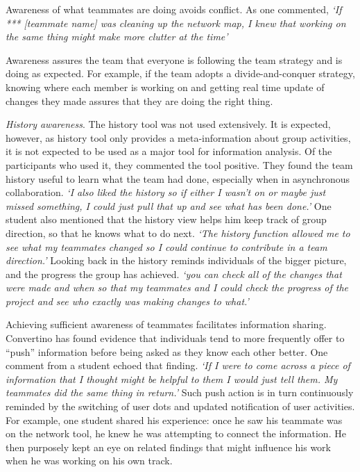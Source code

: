Awareness of what teammates are doing avoids conflict. As one commented, 
\textit{`If *** [teammate name] was cleaning up the network map, I knew that working on the same thing might make more clutter at the time'}

Awareness assures the team that everyone is following the team strategy and is doing as expected. For example, if the team adopts a divide-and-conquer strategy, knowing where each member is working on and getting real time update of changes they made assures that they are doing the right thing.

\textit{History awareness}. %
The history tool was not used extensively. 
It is expected, however, as history tool only provides a meta-information about group activities, it is not expected to be used as a major tool for information analysis. Of the participants who used it, they commented the tool positive. They found the team history useful to learn what the team had done, especially when in asynchronous collaboration. 
\textit{`I also liked the history so if either I wasn't on or maybe just missed something, I could just pull that up and see what has been done.'}
One student also mentioned that the history view helps him keep track of group direction, so that he knows what to do next. 
\textit{`The history function allowed me to see what my teammates changed so I could continue to contribute in a team direction.'}
Looking back in the history reminds individuals of the bigger picture, and the progress the group has achieved. 
\textit{`you can check all of the changes that were made and when so that my teammates and I could check the progress of the project and see who exactly was making changes to what.'}



\vspace{5mm} %

Achieving sufficient awareness of teammates facilitates information sharing. Convertino \cite{Convertino2011} has found evidence that individuals tend to  more frequently  offer to ``push'' information before being asked as they know each other better. One comment from a student echoed that finding.
\textit{`If I were to come across a piece of information that I thought might be helpful to them I would just tell them. My teammates did the same thing in return.'}
Such push action is in turn continuously reminded by the switching of user dots and updated notification of user activities. For example, one student shared his experience: once he saw his teammate was on the network tool, he knew he was attempting to connect the information. He then purposely kept an eye on related findings that might influence his work when he was working on his own track.

